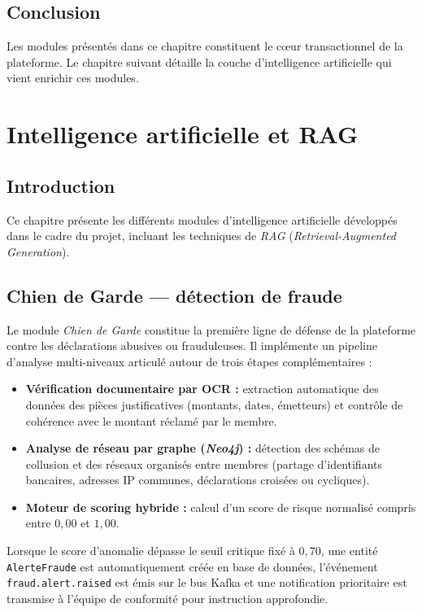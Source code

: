 \documentclass[12pt,a4paper]{report}
\begin{document}
\section{Conclusion}
Les modules présentés dans ce chapitre constituent le cœur transactionnel de la plateforme. Le chapitre suivant détaille la couche d'intelligence artificielle qui vient enrichir ces modules.

\newpage

\chapter{Intelligence artificielle et RAG}

\section{Introduction}
Ce chapitre présente les différents modules d'intelligence artificielle développés dans le cadre du projet, incluant les techniques de \textit{RAG} (\textit{Retrieval-Augmented Generation}).

\section{Chien de Garde — détection de fraude}
Le module \textit{Chien de Garde} constitue la première ligne de défense de la plateforme contre les déclarations abusives ou frauduleuses. Il implémente un pipeline d'analyse multi-niveaux articulé autour de trois étapes complémentaires :
\begin{itemize}
    \item \textbf{Vérification documentaire par OCR :} extraction automatique des données des pièces justificatives (montants, dates, émetteurs) et contrôle de cohérence avec le montant réclamé par le membre.
    \item \textbf{Analyse de réseau par graphe (\textit{Neo4j}) :} détection des schémas de collusion et des réseaux organisés entre membres (partage d'identifiants bancaires, adresses IP communes, déclarations croisées ou cycliques).
    \item \textbf{Moteur de scoring hybride :} calcul d'un score de risque normalisé compris entre $0{,}00$ et $1{,}00$.
\end{itemize}

Lorsque le score d'anomalie dépasse le seuil critique fixé à $0{,}70$, une entité \texttt{AlerteFraude} est automatiquement créée en base de données, l'événement \texttt{fraud.alert.raised} est émis sur le bus Kafka et une notification prioritaire est transmise à l'équipe de conformité pour instruction approfondie.
\end{document}
